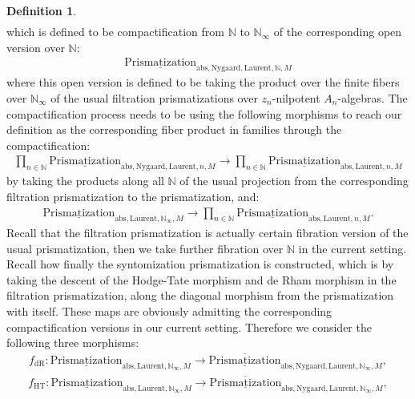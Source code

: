 \documentclass[12pt]{article}
\theoremstyle{definition}
\newtheorem{definition}{Definition}
\begin{document}
\begin{definition}
\begin{align}
\end{align}
which is defined to be compactification from $\mathbb{N}$ to $\mathbb{N}_\infty$ of the corresponding open version over $\mathbb{N}$:
\begin{align}
{\underline{\mathrm{Prismatization}}}_{\mathrm{abs},\mathrm{Nygaard},\mathrm{Laurent},\mathbb{N},M}
\end{align}
where this open version is defined to be taking the product over the finite fibers over $\mathbb{N}_\infty$ of the usual filtration prismatizations over $z_n$-nilpotent $A_n$-algebras. The compactification process needs to be using the following morphisms to reach our definition as the corresponding fiber product in families through the compactification:
\begin{align}
\prod_{n\in \mathbb{N}} {\underline{\mathrm{Prismatization}}}_{\mathrm{abs},\mathrm{Nygaard},\mathrm{Laurent},n,M}\rightarrow  \prod_{n\in \mathbb{N}} {\underline{\mathrm{Prismatization}}}_{\mathrm{abs},\mathrm{Laurent},n,M}
\end{align}
by taking the products along all $\mathbb{N}$ of the usual projection from the corresponding filtration prismatization to the prismatization, and:
\begin{align}
{\underline{\mathrm{Prismatization}}}_{\mathrm{abs},\mathrm{Laurent},\mathbb{N}_\infty,M}\rightarrow  \prod_{n\in \mathbb{N}} {\underline{\mathrm{Prismatization}}}_{\mathrm{abs},\mathrm{Laurent},n,M}.
\end{align}
Recall that the filtration prismatization is actually certain fibration version of the usual prismatization, then we take further fibration over $\mathbb{N}$ in the current setting. Recall how finally the syntomization prismatization is constructed, which is by taking the descent of the Hodge-Tate morphism and de Rham morphism in the filtration prismatization, along the diagonal morphism from the prismatization with itself. These maps are obviously admitting the corresponding compactification versions in our current setting. Therefore we consider the following three morphisms:
\begin{align}
f_\mathrm{dR}: {\underline{\mathrm{Prismatization}}}_{\mathrm{abs},\mathrm{Laurent},\mathbb{N}_\infty,M}\rightarrow \overline{\underline{\mathrm{Prismatization}}}_{\mathrm{abs},\mathrm{Nygaard},\mathrm{Laurent},\mathbb{N}_\infty,M},
\end{align}
\begin{align}
f_\mathrm{HT}: {\underline{\mathrm{Prismatization}}}_{\mathrm{abs},\mathrm{Laurent},\mathbb{N}_\infty,M}\rightarrow \overline{\underline{\mathrm{Prismatization}}}_{\mathrm{abs},\mathrm{Nygaard},\mathrm{Laurent},\mathbb{N}_\infty,M},

\end{align}
\end{definition}
\end{document}
